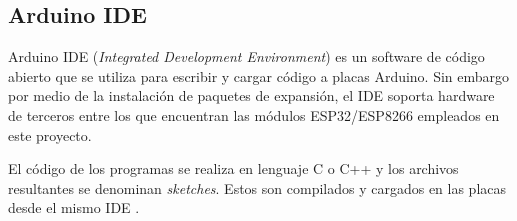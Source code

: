 %
%

\subsection{Arduino IDE}
\label{sec:Arduino IDE}

Arduino IDE (\textit{Integrated Development Environment}) es un software de código abierto que se utiliza para escribir y cargar código a placas Arduino. Sin embargo por medio de la instalación de paquetes de expansión, el IDE soporta hardware de terceros entre los que encuentran las módulos ESP32/ESP8266 \citep{Arduinosupport} empleados en este proyecto.

El código de los programas se realiza en lenguaje C o C++ y los archivos resultantes se denominan \textit{sketches}. Estos son compilados y cargados en las placas desde el mismo IDE \citep{arduinoide}.

